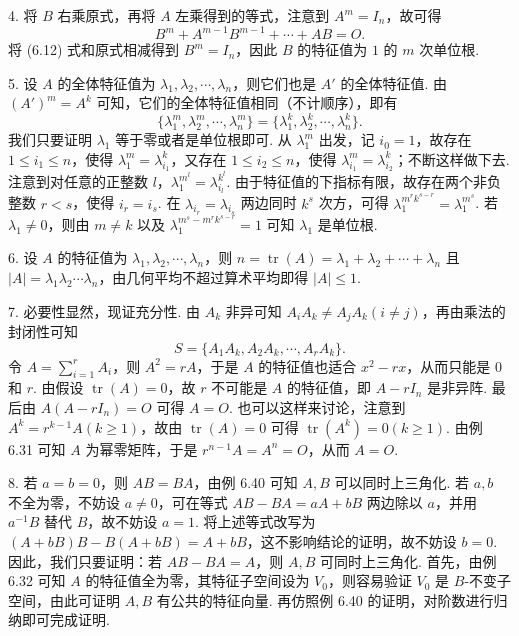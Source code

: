 \documentclass[UTF8, 12pt, fontset=fandol, oneside]{ctexart}
\begin{document}
4. 将 $B$ 右乘原式，再将 $A$ 左乘得到的等式，注意到 $A^m=I_n$，故可得
\begin{equation}
B^m+A^{m-1}B^{m-1}+\cdots+AB=O. \tag{6.12}
\end{equation}
将 (6.12) 式和原式相减得到 $B^m=I_n$，因此 $B$ 的特征值为 $1$ 的 $m$ 次单位根.

5. 设 $A$ 的全体特征值为 $\lambda_1,\lambda_2,\cdots,\lambda_n$，则它们也是 $A'$ 的全体特征值. 由 $(A')^m=A^k$ 可知，它们的全体特征值相同（不计顺序），即有
\[
\{\lambda_1^m,\lambda_2^m,\cdots,\lambda_n^m\}=\{\lambda_1^k,\lambda_2^k,\cdots,\lambda_n^k\}.
\]
我们只要证明 $\lambda_1$ 等于零或者是单位根即可. 从 $\lambda_1^m$ 出发，记 $i_0=1$，故存在 $1\le i_1\le n$，使得 $\lambda_1^m=\lambda_{i_1}^k$，又存在 $1\le i_2\le n$，使得 $\lambda_{i_1}^m=\lambda_{i_2}^k$；不断这样做下去. 注意到对任意的正整数 $l$，$\lambda_1^{m^l}=\lambda_{i_l}^{k^l}$. 由于特征值的下指标有限，故存在两个非负整数 $r<s$，使得 $i_r=i_s$. 在 $\lambda_{i_r}=\lambda_{i_s}$ 两边同时 $k^s$ 次方，可得 $\lambda_1^{m^rk^{s-r}}=\lambda_1^{m^s}$. 若 $\lambda_1\ne 0$，则由 $m\ne k$ 以及 $\lambda_1^{m^s-m^rk^{s-r}}=1$ 可知 $\lambda_1$ 是单位根.

6. 设 $A$ 的特征值为 $\lambda_1,\lambda_2,\cdots,\lambda_n$，则 $n=\operatorname{tr}(A)=\lambda_1+\lambda_2+\cdots+\lambda_n$ 且 $|A|=\lambda_1\lambda_2\cdots\lambda_n$，由几何平均不超过算术平均即得 $|A|\le 1$.

7. 必要性显然，现证充分性. 由 $A_k$ 非异可知 $A_iA_k\ne A_jA_k(i\ne j)$，再由乘法的封闭性可知
\[
S=\{A_1A_k,A_2A_k,\cdots,A_rA_k\}.
\]
令 $A=\sum_{i=1}^rA_i$，则 $A^2=rA$，于是 $A$ 的特征值也适合 $x^2-rx$，从而只能是 $0$ 和 $r$. 由假设 $\operatorname{tr}(A)=0$，故 $r$ 不可能是 $A$ 的特征值，即 $A-rI_n$ 是非异阵. 最后由 $A(A-rI_n)=O$ 可得 $A=O$. 也可以这样来讨论，注意到 $A^k=r^{k-1}A(k\ge 1)$，故由 $\operatorname{tr}(A)=0$ 可得 $\operatorname{tr}(A^k)=0(k\ge 1)$. 由例 6.31 可知 $A$ 为幂零矩阵，于是 $r^{n-1}A=A^n=O$，从而 $A=O$.

8. 若 $a=b=0$，则 $AB=BA$，由例 6.40 可知 $A,B$ 可以同时上三角化. 若 $a,b$ 不全为零，不妨设 $a\ne 0$，可在等式 $AB-BA=aA+bB$ 两边除以 $a$，并用 $a^{-1}B$ 替代 $B$，故不妨设 $a=1$. 将上述等式改写为 $(A+bB)B-B(A+bB)=A+bB$，这不影响结论的证明，故不妨设 $b=0$. 因此，我们只要证明：若 $AB-BA=A$，则 $A,B$ 可同时上三角化. 首先，由例 6.32 可知 $A$ 的特征值全为零，其特征子空间设为 $V_0$，则容易验证 $V_0$ 是 $B$-不变子空间，由此可证明 $A,B$ 有公共的特征向量. 再仿照例 6.40 的证明，对阶数进行归纳即可完成证明.
\end{document}
